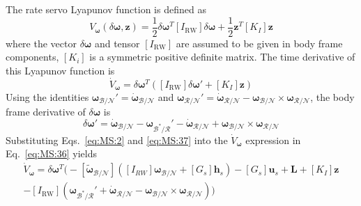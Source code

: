 \documentclass[]{AVSSimReportMemo}
\begin{document}
The rate servo Lyapunov function is defined as 
\begin{equation}
	\label{eq:MS:35}
	V_{\bm\omega}(\delta\bm\omega, \bm z) = \frac{1}{2} \delta\bm\omega ^{T} [I_{\text{RW}}] \delta\bm\omega + \frac{1}{2} \bm z ^{T} [K_{I}] \bm z
\end{equation}
where the vector $\delta\bm\omega$ and tensor $[I_{\text{RW}}]$ are assumed to be given in body frame components, $[K_{i}]$ is a symmetric positive definite matrix.  The time derivative of this Lyapunov function is
\begin{equation}
	\label{eq:MS:36}
	\dot V_{\bm\omega} = \delta\bm\omega^{T} \left(
		[I_{\text{RW}}] \delta\bm\omega' + [K_{I}] \bm z
	\right)
\end{equation}
Using the identities ${\bm\omega}_{\mathcal{B}/\mathcal{N}}' = \dot{\bm\omega}_{\mathcal{B}/\mathcal{N}}$ and $ \bm\omega_{\mathcal{R}/\mathcal{N}}' =  \dot{\bm\omega}_{\mathcal{R}/\mathcal{N}} -  {\bm\omega}_{\mathcal{B}/\mathcal{N}} \times  \bm\omega_{\mathcal{R}/\mathcal{N}}$,\cite{schaub} the body frame derivative of $\delta \bm\omega$ is
\begin{equation}
	\label{eq:MS:37}
	\delta\bm \omega '= \dot{\bm\omega}_{\mathcal{B}/\mathcal{N}} - \bm\omega_{\mathcal{B}^{\ast}/\mathcal{R}} ' -  \dot{\bm\omega}_{\mathcal{R}/\mathcal{N}} +  {\bm\omega}_{\mathcal{B}/\mathcal{N}} \times  \bm\omega_{\mathcal{R}/\mathcal{N}}
\end{equation}
Substituting Eqs.~\eqref{eq:MS:2} and \eqref{eq:MS:37} into the $\dot V_{\bm\omega}$ expression in Eq.~\eqref{eq:MS:36} yields
\begin{multline}
	\label{eq:MS:38}
	\dot V_{\bm\omega} = \delta\bm\omega^{T} \Big(
		- [\tilde{\bm \omega}_{\mathcal{B}/\mathcal{N}}] \left( 
	[I_{RW}] \bm\omega_{\mathcal{B}/\mathcal{N}} + [G_{s}] \bm h_{s} 
	\right) - [G_{s}] \bm u_{s} + \bm L + [K_{I}] \bm z
	\\
	- [I_{\text{RW}}](\bm\omega_{\mathcal{B}^{\ast}/\mathcal{R}} ' +  \dot{\bm\omega}_{\mathcal{R}/\mathcal{N}} - {\bm\omega}_{\mathcal{B}/\mathcal{N}} \times  \bm\omega_{\mathcal{R}/\mathcal{N}})
	\Big)
\end{multline}
\end{document}
